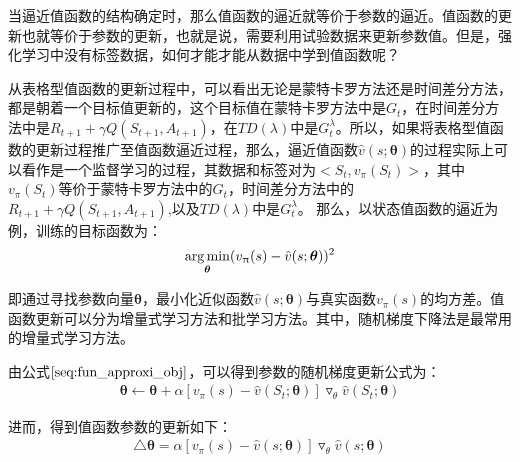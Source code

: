 当逼近值函数的结构确定时，那么值函数的逼近就等价于参数的逼近。值函数的更新也就等价于参数的更新，也就是说，需要利用试验数据来更新参数值。但是，强化学习中没有标签数据，如何才能才能从数据中学到值函数呢？

从表格型值函数的更新过程中，可以看出无论是蒙特卡罗方法还是时间差分方法，都是朝着一个目标值更新的，这个目标值在蒙特卡罗方法中是$G_{t}$，在时间差分方法中是$R_{t+1}+\gamma Q(S_{t+1},A_{t+1})$，在$TD(\lambda)$中是$G^{\lambda}_{t}$。所以，如果将表格型值函数的更新过程推广至值函数逼近过程，那么，逼近值函数$\hat{v}(s;\bm{\theta})$的过程实际上可以看作是一个监督学习的过程，其数据和标签对为$<S_{t}, v_{\pi}(S_{t})>$，其中$v_{\pi}(S_{t})$等价于蒙特卡罗方法中的$G_{t}$，时间差分方法中的$R_{t+1}+\gamma Q(S_{t+1},A_{t+1})$,以及$TD(\lambda)$中是$G^{\lambda}_{t}$。
那么，以状态值函数的逼近为例，训练的目标函数为：
\begin{equation}
\label{seq:fun_approxi_obj}
\begin{aligned}
\operatorname*{arg\,min}_{\bm{\theta}}(v_{\uppi}(s)-\hat{v}(s;\bm{\theta}))^2
\end{aligned}
\end{equation}

即通过寻找参数向量$\bm{\theta}$，最小化近似函数$\hat{v}(s;\bm{\theta})$与真实函数$v_{\pi}(s)$的均方差。值函数更新可以分为增量式学习方法和批学习方法。其中，随机梯度下降法是最常用的增量式学习方法。

由公式$\eqref{seq:fun_approxi_obj}$，可以得到参数的随机梯度更新公式为：
\begin{equation}
\begin{aligned}
\bm{\theta} \gets \bm{\theta}+\alpha[v_{\pi}(s)-\hat{v}(S_{t};\bm{\theta})]\triangledown_{\theta} \hat{v}(S_{t};\bm{\theta})
\end{aligned}
\end{equation}

进而，得到值函数参数的更新如下：
\begin{equation}
\label{seq:gradient}
\begin{aligned}
\triangle \bm{\theta} = \alpha [v_{\pi}(s)-\hat{v}(s;\bm{\theta})] \triangledown_{\theta} \hat{v}(s;\bm
{\theta})
\end{aligned}
\end{equation}


